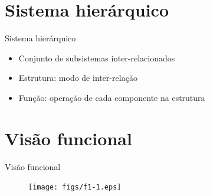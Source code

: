 \section[ slide = true]{Sistema hierárquico}
\begin{slide}[toc=]{Sistema hierárquico}
   \begin{itemize}
         \item Conjunto de subsistemas inter-relacionados
         \item Estrutura: modo de inter-relação
         \item Função: operação de cada componente na estrutura
   \end{itemize}
\end{slide}

\section[ slide = true]{Visão funcional}
 \begin{slide}[toc=]{Visão funcional}
    \begin{figure}[h]
      \centering
      \texttt{[image: figs/f1-1.eps]}
    \end{figure}
\end{slide}


